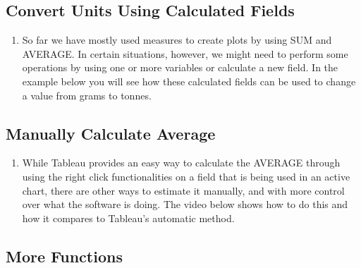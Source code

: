 \documentclass[
]{book}
\providecommand{\tightlist}{%
  \setlength{\itemsep}{0pt}\setlength{\parskip}{0pt}}
\begin{document}
\hypertarget{convert-units-using-calculated-fields}{%
\subsection{Convert Units Using Calculated Fields}\label{convert-units-using-calculated-fields}}

\begin{enumerate}
\def\labelenumi{\arabic{enumi}.}
\tightlist
\item
  So far we have mostly used measures to create plots by using SUM and AVERAGE. In certain situations, however, we might need to perform some operations by using one or more variables or calculate a new field. In the example below you will see how these calculated fields can be used to change a value from grams to tonnes.
\end{enumerate}

\hypertarget{manually-calculate-average}{%
\subsection{Manually Calculate Average}\label{manually-calculate-average}}

\begin{enumerate}
\def\labelenumi{\arabic{enumi}.}
\tightlist
\item
  While Tableau provides an easy way to calculate the AVERAGE through using the right click functionalities on a field that is being used in an active chart, there are other ways to estimate it manually, and with more control over what the software is doing. The video below shows how to do this and how it compares to Tableau's automatic method.
\end{enumerate}

\hypertarget{more-functions}{%
\subsection{More Functions}\label{more-functions}}
\end{document}
